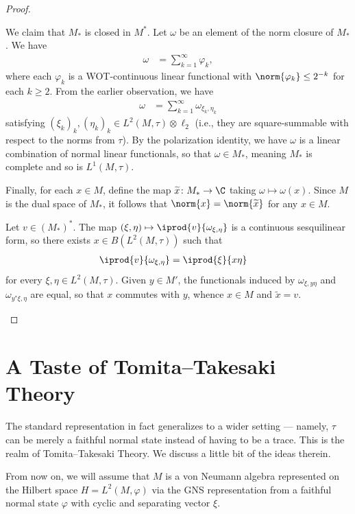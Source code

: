 \documentclass[10pt]{mypackage}
\begin{document}
\begin{proof}
\begin{enumerate}[(i)]
      We claim that $M_{\ast}$ is closed in $M^{\ast}$. Let $\omega$ be an element of the norm closure of $M_{\ast}$. We have
      \begin{align*}
        \omega &= \sum_{k=1}^{\infty}\varphi_k,
      \end{align*}
      where each $\varphi_k$ is a WOT-continuous linear functional with $\norm{\varphi_k} \leq 2^{-k}$ for each $k\geq 2$. From the earlier observation, we have
      \begin{align*}
        \omega &= \sum_{k=1}^{\infty}\omega_{\xi_k,\eta_k}
      \end{align*}
      satisfying $\left( \xi_k \right)_{k},\left( \eta_k \right)_{k}\in L^2\left( M,\tau \right)\otimes \ell_2$ (i.e., they are square-summable with respect to the norms from $\tau$). By the polarization identity, we have $\omega$ is a linear combination of normal linear functionals, so that $\omega\in M_{\ast}$, meaning $M_{\ast}$ is complete and so is $L^1\left( M,\tau \right)$.

      Finally, for each $x\in M$, define the map $ \widetilde{x} \colon M_{\ast}\rightarrow \C$ taking $\omega\mapsto \omega(x)$. Since $M$ is the dual space of $ M_{\ast} $, it follows that $\norm{x} = \norm{ \widetilde{x} }$ for any $x\in M$.

      Let $v\in \left( M_{\ast} \right)^{\ast}$. The map $ \left( \xi,\eta \right)\mapsto \iprod{v}{\omega_{\xi,\eta}} $ is a continuous sesquilinear form, so there exists $x\in B\left( L^2\left( M,\tau \right) \right)$ such that
      \begin{align*}
        \iprod{v}{\omega_{\xi,\eta}} &= \iprod{\xi}{x\eta}
      \end{align*}
      for every $\xi,\eta\in L^2\left( M,\tau \right)$. Given $y\in M'$, the functionals induced by $\omega_{\xi,y\eta}$ and $\omega_{y^{\ast}\xi,\eta}$ are equal, so that $x$ commutes with $y$, whence $x\in M$ and $ \widetilde{x} = v $.
  \end{enumerate}
\end{proof}
\section{A Taste of Tomita--Takesaki Theory}%
The standard representation in fact generalizes to a wider setting --- namely, $\tau$ can be merely a faithful normal state instead of having to be a trace. This is the realm of Tomita--Takesaki Theory. We discuss a little bit of the ideas therein.

From now on, we will assume that $M$ is a von Neumann algebra represented on the Hilbert space $H = L^2\left( M,\varphi \right)$ via the GNS representation from a faithful normal state $\varphi$ with cyclic and separating vector $\xi$.
\end{document}
